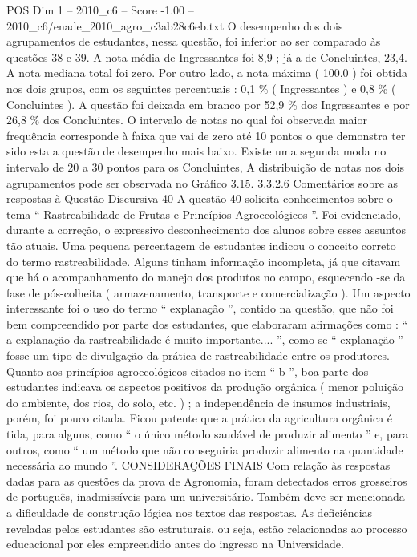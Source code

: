 \begin{textsample}{POS Dim 1 – 2010\_c6 – Score -1.00 – 2010\_c6/enade\_2010\_agro\_c3ab28c6eb.txt}
O desempenho dos dois agrupamentos de estudantes, nessa questão, foi inferior ao ser comparado às questões 38 e 39.
A nota média de Ingressantes foi 8,9 ; já a de Concluintes, 23,4.
A nota mediana total foi zero.
Por outro lado, a nota máxima ( 100,0 ) foi obtida nos dois grupos, com os seguintes percentuais : 0,1 \% ( Ingressantes ) e 0,8 \% ( Concluintes ).
A questão foi deixada em branco por 52,9 \% dos Ingressantes e por 26,8 \% dos Concluintes.
O intervalo de notas no qual foi observada maior frequência corresponde à faixa que vai de zero até 10 pontos o que demonstra ter sido esta a questão de desempenho mais baixo.
Existe uma segunda moda no intervalo de 20 a 30 pontos para os Concluintes, A distribuição de notas nos dois agrupamentos pode ser observada no Gráfico 3.15. 3.3.2.6 Comentários sobre as respostas à Questão Discursiva 40 A questão 40 solicita conhecimentos sobre o tema “ Rastreabilidade de Frutas e Princípios Agroecológicos ”.
Foi evidenciado, durante a correção, o expressivo desconhecimento dos alunos sobre esses assuntos tão atuais.
Uma pequena percentagem de estudantes indicou o conceito correto do termo rastreabilidade.
Alguns tinham informação incompleta, já que citavam que há o acompanhamento do manejo dos produtos no campo, esquecendo -se da fase de pós-colheita ( armazenamento, transporte e comercialização ).
Um aspecto interessante foi o uso do termo “ explanação ”, contido na questão, que não foi bem compreendido por parte dos estudantes, que elaboraram afirmações como : “ a explanação da rastreabilidade é muito importante.... ”, como se “ explanação ” fosse um tipo de divulgação da prática de rastreabilidade entre os produtores.
Quanto aos princípios agroecológicos citados no item “ b ”, boa parte dos estudantes indicava os aspectos positivos da produção orgânica ( menor poluição do ambiente, dos rios, do solo, etc. ) ; a independência de insumos industriais, porém, foi pouco citada.
Ficou patente que a prática da agricultura orgânica é tida, para alguns, como “ o único método saudável de produzir alimento ” e, para outros, como “ um método que não conseguiria produzir alimento na quantidade necessária ao mundo ”.
CONSIDERAÇÕES FINAIS Com relação às respostas dadas para as questões da prova de Agronomia, foram detectados erros grosseiros de português, inadmissíveis para um universitário.
Também deve ser mencionada a dificuldade de construção lógica nos textos das respostas.
As deficiências reveladas pelos estudantes são estruturais, ou seja, estão relacionadas ao processo educacional por eles empreendido antes do ingresso na Universidade.

\end{textsample}
